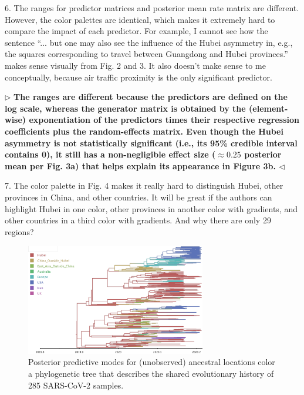 \documentclass[12pt]{article}
\newenvironment{reply}{$\triangleright$\bfseries}{$\triangleleft$}
\begin{document}
6. The ranges for predictor matrices and posterior mean rate matrix are different. However, the color palettes are identical, which makes it extremely hard to compare the impact of each predictor. For example, I cannot see how the sentence ``... but one may also see the influence of the Hubei asymmetry in, e.g., the squares corresponding to travel between Guangdong and Hubei provinces.'' makes sense visually from Fig. 2 and 3. It also doesn’t make sense to me conceptually, because air traffic proximity is the only significant predictor.


\begin{reply}
The ranges are different because the predictors are defined on the log scale, whereas the generator matrix is obtained by the (element-wise) exponentiation of the predictors times their respective regression coefficients plus the random-effects matrix.  Even though the Hubei asymmetry is not statistically significant (i.e., its 95\% credible interval contains 0), it still has a non-negligible effect size ($\approx 0.25$ posterior mean per Fig. 3a) that helps explain its appearance in Figure 3b.
\end{reply}

7.	The color palette in Fig. 4 makes it really hard to distinguish Hubei, other provinces in China, and other countries. It will be great if the authors can highlight Hubei in one color, other provinces in another color with gradients, and other countries in a third color with gradients. And why there are only 29 regions?


\setcounter{figure}{3}
\begin{figure}[!t]
	\centering
	\includegraphics[width=0.7\textwidth]{figures/summary2.tree.pdf}
	\vspace{-0.5em}
	\caption{Posterior predictive modes for (unobserved) ancestral
		locations color a phylogenetic tree that describes the
		shared evolutionary history of 285 SARS-CoV-2
		samples.}\label{fig:tree}
\end{figure}
\end{document}
